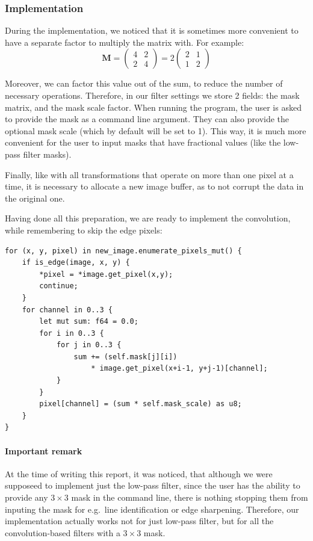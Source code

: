 \documentclass[12pt]{article}
\begin{document}
\subsubsection{Implementation}

During the implementation, we noticed that it is sometimes more convenient
to have a separate factor to multiply the matrix with.
For example:
\[
    \mathbf{M} = \begin{pmatrix}
        4 & 2 \\ 2 & 4
    \end{pmatrix} = 2 \begin{pmatrix}
        2 & 1 \\ 1 & 2
    \end{pmatrix}
\]

Moreover, we can factor this value out of the sum, to reduce the number of necessary operations.
Therefore, in our filter settings we store 2 fields: the mask matrix, and the mask scale factor.
When running the program, the user is asked to provide the mask as a command line argument.
They can also provide the optional mask scale (which by default will be set to 1).
This way, it is much more convenient for the user to input masks that have fractional values (like the low-pass filter masks).

Finally, like with all transformations that operate on more than one pixel at a time,
it is necessary to allocate a new image buffer, as to not corrupt the data in the original one.

Having done all this preparation, we are ready to implement the convolution, while remembering to skip the edge pixels:

\pagebreak[3]
\begin{lstlisting}
for (x, y, pixel) in new_image.enumerate_pixels_mut() {
    if is_edge(image, x, y) {
        *pixel = *image.get_pixel(x,y);
        continue;
    }
    for channel in 0..3 {
        let mut sum: f64 = 0.0;
        for i in 0..3 {
            for j in 0..3 {
                sum += (self.mask[j][i])
                    * image.get_pixel(x+i-1, y+j-1)[channel];
            }
        }
        pixel[channel] = (sum * self.mask_scale) as u8;
    }
}
\end{lstlisting}

\paragraph{Important remark}
At the time of writing this report, it was noticed, that although we were supposeed to implement just the low-pass filter,
since the user has the ability to provide any $3\times3$ mask in the command line,
there is nothing stopping them from inputing the mask for e.g.\ line identification or edge sharpening.
Therefore, our implementation actually works not for just low-pass filter, but for all the convolution-based filters with a $3\times3$ mask.
\end{document}
